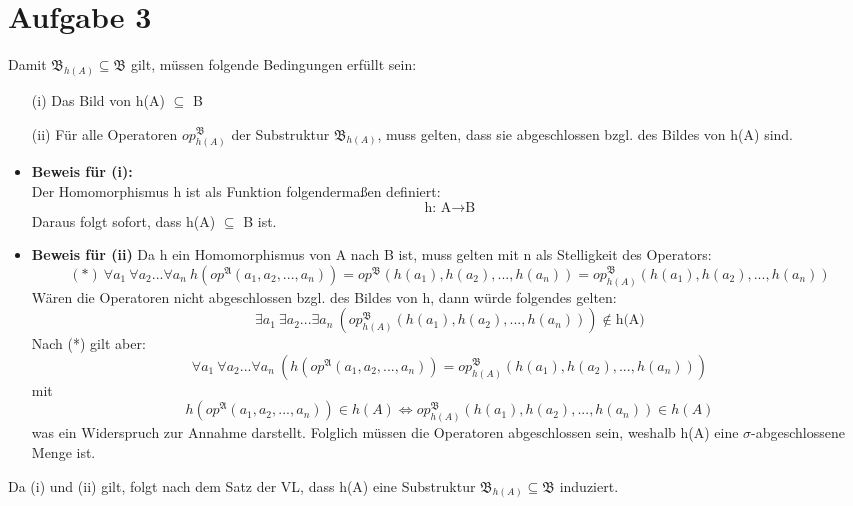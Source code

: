 \documentclass[a4paper,10pt]{article}
\begin{document}
\section*{Aufgabe 3}
Damit $\mathfrak{B}_{h(A)} \subseteq \mathfrak{B}$ gilt, müssen folgende Bedingungen erfüllt sein: 
\begin{enumerate}
\item[(i)]
Das Bild von h(A) $\subseteq$ B 

\item[(ii)]
Für alle Operatoren $op^\mathfrak{B}_{h(A)}$ der Substruktur $\mathfrak{B}_{h(A)}$, muss gelten, 
dass sie abgeschlossen bzgl. des Bildes von h(A) sind.
\end{enumerate}
\begin{itemize}
	\item 	\textbf{Beweis für (i):}\\
		Der Homomorphismus h ist als Funktion folgendermaßen definiert: 
		\[\text{h: A}\rightarrow\text{B} \]
		Daraus folgt sofort, dass h(A) $\subseteq$ B ist. 
	\item  	\textbf{Beweis für (ii)}
		Da h ein Homomorphismus von A  nach B ist, muss gelten mit n als Stelligkeit des Operators: 
		\[ (*)~ \forall a_1~ \forall a_2 ... \forall a_n~ h(op^{\mathfrak{A}}(a_1,a_2,...,a_n)) 
		= op^{\mathfrak{B}}(h(a_1),h(a_2),...,h(a_n)) 
		= op^{\mathfrak{B}}_{h(A)}(h(a_1),h(a_2),...,h(a_n))\] 
Wären die Operatoren nicht abgeschlossen bzgl. des Bildes von h, dann würde folgendes gelten: 
\[\exists a_1~ \exists a_2 ... \exists a_n~ (op^\mathfrak{B}_{h(A)} (h(a_1),h(a_2),...,h(a_n))) \notin \text{h(A)} \]
Nach (*) gilt aber: 
\[\forall a_1~ \forall a_2 ... \forall a_n~ 
(h(op^{\mathfrak{A}}(a_1,a_2,...,a_n)) = op^{\mathfrak{B}}_{h(A)}(h(a_1),h(a_2),...,h(a_n)) )\] mit
\[h(op^{\mathfrak{A}}(a_1,a_2,...,a_n)) \in h(A) \Leftrightarrow op^{\mathfrak{B}}_{h(A)}(h(a_1),h(a_2),...,h(a_n)) \in h(A)\]
was ein Widerspruch zur Annahme darstellt. Folglich müssen die Operatoren abgeschlossen sein, weshalb h(A) eine $\sigma$-abgeschlossene Menge ist. 
\end{itemize}
Da (i) und (ii) gilt, folgt nach dem Satz der VL, dass h(A) eine Substruktur $\mathfrak{B}_{h(A)} \subseteq \mathfrak{B}$ induziert.
\end{document}
